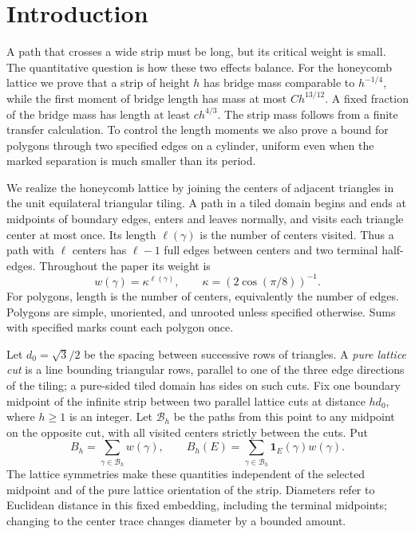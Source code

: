 \section{Introduction}\label{sec:introduction}

A path that crosses a wide strip must be long, but its critical weight is small. The quantitative question is how these two effects balance. For the honeycomb lattice we prove that a strip of height $h$ has bridge mass comparable to $h^{-1/4}$, while the first moment of bridge length has mass at most $Ch^{13/12}$. A fixed fraction of the bridge mass has length at least $ch^{4/3}$. The strip mass follows from a finite transfer calculation. To control the length moments we also prove a bound for polygons through two specified edges on a cylinder, uniform even when the marked separation is much smaller than its period.

We realize the honeycomb lattice by joining the centers of adjacent triangles in the unit equilateral triangular tiling. A path in a tiled domain begins and ends at midpoints of boundary edges, enters and leaves normally, and visits each triangle center at most once. Its length $\ell(\gamma)$ is the number of centers visited. Thus a path with $\ell$ centers has $\ell-1$ full edges between centers and two terminal half-edges. Throughout the paper its weight is
\[
 w(\gamma)=\kappa^{\ell(\gamma)},\qquad
 \kappa=(2\cos(\pi/8))^{-1}.
\]
For polygons, length is the number of centers, equivalently the number of edges. Polygons are simple, unoriented, and unrooted unless specified otherwise. Sums with specified marks count each polygon once.

Let $d_0=\sqrt3/2$ be the spacing between successive rows of triangles. A \emph{pure lattice cut} is a line bounding triangular rows, parallel to one of the three edge directions of the tiling; a pure-sided tiled domain has sides on such cuts. Fix one boundary midpoint of the infinite strip between two parallel lattice cuts at distance $h d_0$, where $h\ge1$ is an integer. Let $\mathcal B_h$ be the paths from this point to any midpoint on the opposite cut, with all visited centers strictly between the cuts. Put
\[
 B_h=\sum_{\gamma\in\mathcal B_h}w(\gamma),\qquad
 B_h(E)=\sum_{\gamma\in\mathcal B_h}\mathbf1_E(\gamma)w(\gamma).
\]
The lattice symmetries make these quantities independent of the selected midpoint and of the pure lattice orientation of the strip. Diameters refer to Euclidean distance in this fixed embedding, including the terminal midpoints; changing to the center trace changes diameter by a bounded amount.

